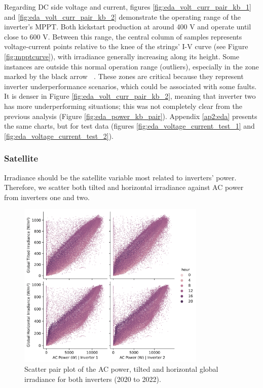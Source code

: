 Regarding DC side voltage and current, figures \ref{fig:eda_volt_curr_pair_kb_1} and \ref{fig:eda_volt_curr_pair_kb_2} demonstrate the operating range of the inverter's MPPT. Both kickstart production at around 400 V and operate until close to 600 V. Between this range, the central column of samples represents voltage-current points relative to the knee of the strings' I-V curve (see Figure \ref{fig:mpptcurve}), with irradiance generally increasing along its height. Some instances are outside this normal operation range (outliers), especially in the zone marked by the black arrow \textcircled{}\textcircled{}. These zones are critical because they represent inverter underperformance scenarios, which could be associated with some faults. It is denser in Figure \ref{fig:eda_volt_curr_pair_kb_2}, meaning that inverter two has more underperforming situations; this was not completely clear from the previous analysis (Figure \ref{fig:eda_power_kb_pair}). Appendix \ref{ap2:eda} presents the same charts, but for test data (figures \ref{fig:eda_voltage_current_test_1} and \ref{fig:eda_voltage_current_test_2}).

\subsubsection{Satellite} \label{subsubsec:eda_sat}

Irradiance should be the satellite variable most related to inverters' power. Therefore, we scatter both tilted and horizontal irradiance against AC power from inverters one and two.

\begin{figure}[h!]
    \centering
    \includegraphics[width=0.8\textwidth]{figures/chapter5/analysis/08_power_irrad_pairplot_scatter_kb-1.png}
    \caption{Scatter pair plot of the AC power, tilted and horizontal global irradiance for both inverters (2020 to 2022).}
    \label{fig:eda_power_irrad_pair_kb}
\end{figure}

